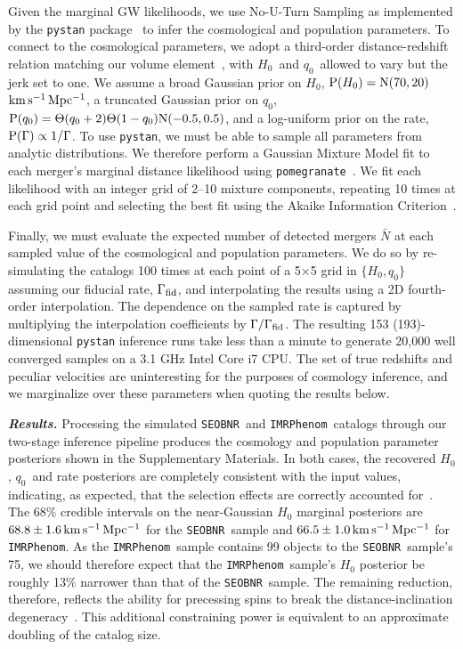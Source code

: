 \documentclass[%
 reprint,
 superscriptaddress,
 nofootinbib,
 amsmath,amssymb,
 aps,
]{revtex4-2}
\newcommand{\hubble}{\ensuremath{H_0}}
\newcommand{\decel}{\ensuremath{q_0}}
\newcommand{\prob}{\ensuremath{{\rm P}}}
\newcommand{\normal}{{\rm{N}}}
\newcommand{\nexp}{\bar{N}}
\newcommand{\rate}{\Gamma}
\newcommand{\step}{\Theta}
\newcommand{\kmsmpc}{\ensuremath{{\rm km\,s^{-1}\,Mpc^{-1}}}}
\newcommand{\seobnr}{\texttt{SEOBNR}}
\newcommand{\imrp}{\texttt{IMRPhenom}}
\begin{document}
Given the marginal GW likelihoods, we use No-U-Turn Sampling as implemented by the \texttt{pystan} package~\cite{pystan} to infer the cosmological and population parameters. To connect to the cosmological parameters, we adopt a third-order distance-redshift relation matching our volume element~\cite{Visser:2004}, with \hubble\ and \decel\ allowed to vary but the jerk set to one. We assume a broad Gaussian prior on \hubble, $\prob(\hubble)=\normal(70,20)$ \kmsmpc, a truncated Gaussian prior on \decel, $\prob(\decel)=\step(\decel+2)\step(1-\decel)\normal(-0.5,0.5)$, and a log-uniform prior on the rate, $\prob(\rate) \propto 1/\rate$. To use \texttt{pystan}, we must be able to sample all parameters from analytic distributions. We therefore perform a Gaussian Mixture Model fit to each merger's marginal distance likelihood using \texttt{pomegranate}~\cite{Schreiber:2017}. We fit each likelihood with an integer grid of 2--10 mixture components, repeating 10 times at each grid point and selecting the best fit using the Akaike Information Criterion~\cite{Akaike:1974}.

Finally, we must evaluate the expected number of detected mergers $\nexp$ at each sampled value of the cosmological and population parameters. We do so by re-simulating the catalogs 100 times at each point of a 5$\times$5 grid in $\{H_0,q_0\}$ assuming our fiducial rate, $\Gamma_{\rm fid}$, and interpolating the results using a 2D fourth-order interpolation. The dependence on the sampled rate is captured by multiplying the interpolation coefficients by $\Gamma/\Gamma_{\rm fid}$. The resulting 153 (193)-dimensional \texttt{pystan} inference runs take less than a minute to generate 20,000 well converged samples on a 3.1 GHz Intel Core i7 CPU. The set of true redshifts and peculiar velocities are uninteresting for the purposes of cosmology inference, and we marginalize over these parameters when quoting the results below.


\textbf{\emph{Results.}} Processing the simulated \seobnr\ and \imrp\ catalogs through our two-stage inference pipeline produces the cosmology and population parameter posteriors shown in the Supplementary Materials. In both cases, the recovered \hubble, \decel\ and rate posteriors are completely consistent with the input values, indicating, as expected, that the selection effects are correctly accounted for~\cite{Mortlock_etal:2019}. The 68\% credible intervals on the near-Gaussian $\hubble$ marginal posteriors are $68.8 \pm 1.6\,\kmsmpc$ for the \seobnr\ sample and $66.5 \pm 1.0\,\kmsmpc$ for \imrp. As the \imrp\ sample contains 99 objects to the \seobnr\ sample's 75, we should therefore expect that the \imrp\ sample's $\hubble$ posterior be roughly 13\% narrower than that of the \seobnr\ sample. The remaining reduction, therefore, reflects the ability for precessing spins to break the distance-inclination degeneracy~\cite[e.g.,][]{Apostolatos_etal:1994,Cutler_Flanagan:1994,Vecchio:2004,Chen_etal:2018}. This additional constraining power is equivalent to an approximate doubling of the catalog size.
\end{document}
